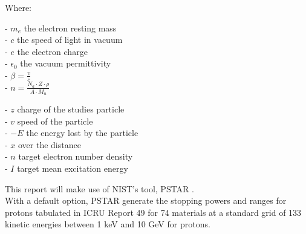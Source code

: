 \documentclass[12pt,a4paper]{report}
\begin{document}
Where: \\
\begin{minipage}[b]{0.5\linewidth}
\vspace{0.5cm}
- $m_e$ the electron resting mass\\
- $c$ the speed of light in vacuum\\
- $e$ the electron charge\\
- $\epsilon_0$ the vacuum permittivity\\
- $\beta=\frac{v}{c}$\\
- $n=\frac{N_a\cdot Z \cdot \rho}{A\cdot M_u}$\\
\end{minipage}
\begin{minipage}[b]{0.5\linewidth}
- $z$ charge of the studies particle\\
- $v$ speed of the particle\\
- $-E$ the energy lost by the particle\\
- $x$ over the distance\\
- $n$ target electron number density \\
- $I$ target mean excitation energy \\
\end{minipage}


This report will make use of NIST's tool, PSTAR \citet{STAR}.
\\
With a default option, PSTAR generate the stopping powers and ranges for protons tabulated in ICRU Report 49 \citet{deasy1994icru} for 74 materials at a standard grid of 133 kinetic energies between 1 keV and 10 GeV for protons.



\vspace{2cm}
\end{document}
